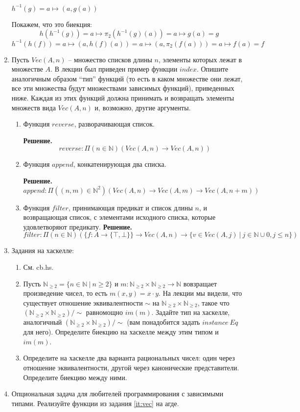 \begin{enumerate}
$h^{-1}(g) = a \mapsto (a, g(a))$

Покажем, что это биекция:
$$h(h^{-1}(g)) = a \mapsto \pi_2(h^{-1}(g)(a)) = a \mapsto g(a) = g$$
$$h^{-1}(h(f)) = a \mapsto (a, h(f)(a)) = a \mapsto (a, \pi_2(f(a))) = a \mapsto f(a) = f$$

\item \label{it:vec}
    Пусть $Vec(A,n)$ -- множество списков длины $n$, элементы которых лежат в множестве $A$.
    В лекции был приведен пример функции $index$.
    Опишите аналогичным образом ``тип'' функций (то есть в каком множестве они лежат, все эти множества будут множествами зависимых функций), приведенных ниже.
    Каждая из этих функций должна принимать и возвращать элементы множеств вида $Vec(A,n)$ и, возможно, другие аргументы.
\begin{enumerate}
\item Функция $reverse$, разворачивающая список.

\textbf{Решение.} $$reverse : \Pi(n \in \mathbb{N}) (Vec(A, n) \rightarrow Vec(A, n)) $$

\item Функция $append$, конкатенирующая два списка.

\textbf{Решение.} $$append : \Pi((n,m) \in \mathbb{N}^2) (Vec(A, n) \rightarrow Vec(A, m) 
\rightarrow Vec(A, n + m)) $$

\item Функция $filter$, принимающая предикат и список длины $n$, и возвращающая список, с 
элементами исходного списка, которые удовлетворяют предикату.
\textbf{Решение.} $$filter : \Pi(n \in \mathbb{N}) (\{f:A\rightarrow \{\top, \bot\}\} \rightarrow Vec(A, n) \rightarrow \{v \in Vec(A, j) \ \big| \ j \in \mathbb{N}\cup {0}, j \leqslant n\}) $$
\end{enumerate}

\item Задания на хаскелле:
\begin{enumerate}
\item См. cb.hs.
\item Пусть $\mathbb{N}_{\geq 2} = \{ n \in \mathbb{N}\ |\ n \geq 2 \}$ и $m : \mathbb{N}_{\geq 2} \times \mathbb{N}_{\geq 2} \to \mathbb{N}$ вовзращает произведение чисел, то есть $m(x,y) = x \cdot y$.
    На лекции мы видели, что существует отношение эквивалентности $\sim$ на $\mathbb{N}_{\geq 2} \times \mathbb{N}_{\geq 2}$, такое что $(\mathbb{N}_{\geq 2} \times \mathbb{N}_{\geq 2})/\!\!\sim$ равномощно $im(m)$.
    Задайте тип на хаскелле, аналогичный $(\mathbb{N}_{\geq 2} \times \mathbb{N}_{\geq 2})/\!\!\sim$ (вам понадобится задать $instance\ Eq$ для него).
    Определите биекцию на хаскелле между этим типом и $im(m)$.
\item
{
    Определите на хаскелле два варианта рациональных чисел: один через отношение эквивалентности, другой через канонические представители.
}
    Определите биекцию между ними.
\end{enumerate}

\item Опциональная задача для любителей программирования с зависимыми типами. Реализуйте функции из задания \ref{it:vec} на агде.

\end{enumerate}
